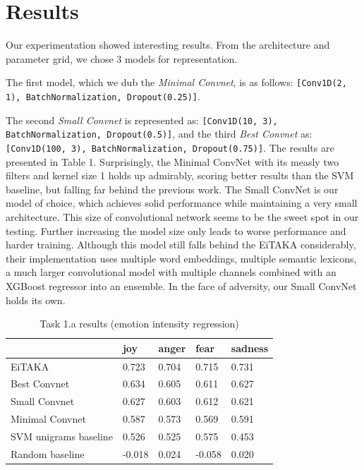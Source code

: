 \documentclass[10pt, a4paper]{article}
\begin{document}
\section{Results}
Our experimentation showed interesting results. 
From the architecture and parameter grid, we chose 3 models for representation.

The first model, which we dub the \textit{Minimal Convnet}, is as follows:
\texttt{[Conv1D(2, 1), BatchNormalization, Dropout(0.25)]}.

The second \textit{Small Convnet} is represented as: 
\texttt{[Conv1D(10, 3), BatchNormalization, Dropout(0.5)]}, and the third 
\textit{Best Convnet} as: 
\texttt{[Conv1D(100, 3), BatchNormalization, Dropout(0.75)]}.
The results are presented in Table 1.
Surprisingly, the Minimal ConvNet with its measly two filters 
and kernel size 1 holds up admirably, scoring
better results than the SVM baseline, but falling far behind the 
previous work.
The Small ConvNet is our model of choice, which achieves solid 
performance while maintaining a very small architecture.
This size of convolutional network seems to be the sweet spot in our testing.
Further increasing the model size only leads to worse performance and 
harder training.
Although this model still falls behind the EiTAKA considerably, their
implementation uses multiple word embeddings, multiple semantic lexicons,
a much larger convolutional model with multiple channels combined with an
XGBoost regressor into an ensemble.
In the face of adversity, our Small ConvNet holds its own.


\begin{table}
\caption{Task 1.a results (emotion intensity regression)}
\label{tab:narrow-table}
\begin{center}
\begin{tabular}{lllll}
\toprule
& joy & anger & fear & sadness \\
\midrule
EiTAKA    & 0.723  & 0.704 & 0.715 & 0.731 \\
Best Convnet & 0.634 & 0.605 & 0.611 & 0.627 \\
Small Convnet & 0.627 & 0.603 & 0.612 & 0.621 \\
Minimal Convnet & 0.587 & 0.573 & 0.569 & 0.591 \\
SVM unigrams baseline & 0.526 & 0.525 & 0.575 & 0.453 \\
Random baseline & -0.018 & 0.024 & -0.058 & 0.020 \\
\bottomrule
\end{tabular}
\end{center}
\end{table}
\end{document}
